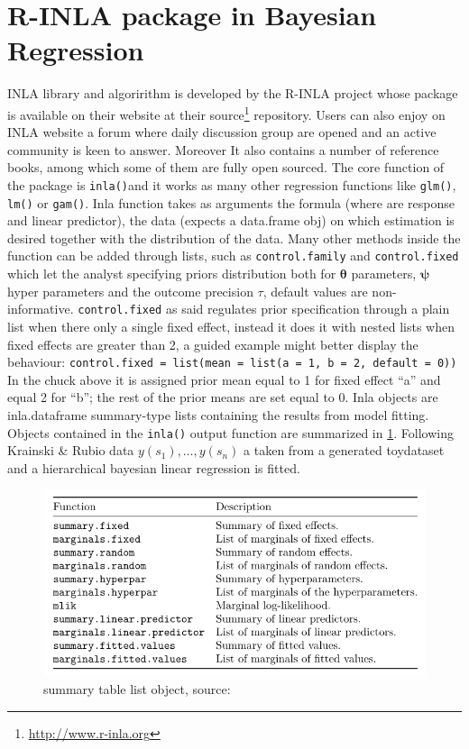 \documentclass[
  12pt,
  a4paper,
  oneside]{book}
\newcommand{\passthrough}[1]{#1}
\DeclareRobustCommand{\href}[2]{#2\footnote{\url{#1}}}
\theoremstyle{definition}
\theoremstyle{definition}
\theoremstyle{definition}
\theoremstyle{remark}
\begin{document}
\hypertarget{rinla}{%
\section{R-INLA package in Bayesian Regression}\label{rinla}}

INLA library and algoririthm is developed by the R-INLA project whose package is available on their website at their \href{http://www.r-inla.org}{source} repository. Users can also enjoy on INLA website a forum where daily discussion group are opened and an active community is keen to answer. Moreover It also contains a number of reference books, among which some of them are fully open sourced.
The core function of the package is \passthrough{\lstinline!inla()!}and it works as many other regression functions like \passthrough{\lstinline!glm()!}, \passthrough{\lstinline!lm()!} or \passthrough{\lstinline!gam()!}. Inla function takes as arguments the formula (where are response and linear predictor), the data (expects a data.frame obj) on which estimation is desired together with the distribution of the data. Many other methods inside the function can be added through lists, such as \passthrough{\lstinline!control.family!} and \passthrough{\lstinline!control.fixed!} which let the analyst specifying priors distribution both for \(\boldsymbol{\theta}\) parameters, \(\boldsymbol{\psi}\) hyper parameters and the outcome precision \(\tau\), default values are non-informative.
\passthrough{\lstinline!control.fixed!} as said regulates prior specification through a plain list when there only a single fixed effect, instead it does it with nested lists when fixed effects are greater than 2, a guided example might better display the behaviour:
\passthrough{\lstinline!control.fixed = list(mean = list(a = 1, b = 2, default = 0))!}
In the chuck above it is assigned prior mean equal to 1 for fixed effect ``a'' and equal 2 for ``b''; the rest of the prior means are set equal to 0.
Inla objects are inla.dataframe summary-type lists containing the results from model fitting. Objects contained in the \passthrough{\lstinline!inla()!} output function are summarized in \ref{fig:summartable}. Following Krainski \& Rubio \citeyearpar{Krainski-Rubio} data \(y(s_{1}), \ldots, y(s_{n})\) a taken from a generated toydataset and a hierarchical bayesian linear regression is fitted.

\begin{figure}
\centering
\includegraphics{images/summarytable.PNG}
\caption{\label{fig:summartable}summary table list object, source: \citet{Krainski-Rubio}}
\end{figure}
\end{document}
